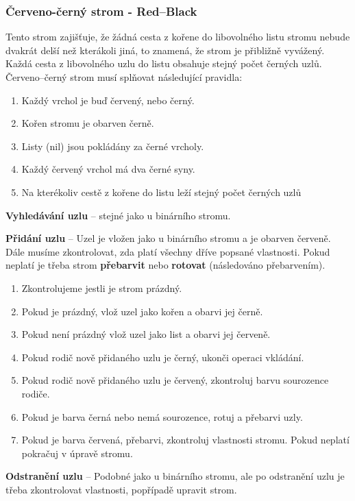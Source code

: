 \subsubsection{Červeno-černý strom - Red–Black}
Tento strom zajišťuje, že žádná cesta z kořene do libovolného listu stromu nebude dvakrát delší než kterákoli jiná, to znamená, že strom je přibližně vyvážený. Každá cesta z libovolného uzlu do listu obsahuje stejný počet černých uzlů. Červeno--černý strom musí splňovat následující pravidla:
\begin{enumerate}
\item Každý vrchol je buď červený, nebo černý.
\item Kořen stromu je obarven černě.
\item Listy (nil) jsou pokládány za černé vrcholy.
\item Každý červený vrchol má dva černé syny.
\item Na kterékoliv cestě z kořene do listu leží stejný počet černých uzlů
\end{enumerate}

\textbf{Vyhledávání uzlu} -- stejné jako u binárního stromu.


\textbf{Přidání uzlu} -- Uzel je vložen jako u binárního stromu a je obarven červeně. Dále musíme zkontrolovat, zda platí všechny dříve popsané vlastnosti. Pokud neplatí je třeba strom \textbf{přebarvit} nebo \textbf{rotovat} (následováno přebarvením).
\begin{enumerate}
\item Zkontrolujeme jestli je strom prázdný.
\item Pokud je prázdný, vlož uzel jako kořen a obarvi jej černě.
\item Pokud není prázdný vlož uzel jako list a obarvi jej červeně.
\item Pokud rodič nově přidaného uzlu je černý, ukonči operaci vkládání.
\item Pokud rodič nově přidaného uzlu je červený, zkontroluj barvu sourozence rodiče.
\item Pokud je barva černá nebo nemá sourozence, rotuj a přebarvi uzly.
\item Pokud je barva červená, přebarvi, zkontroluj vlastnosti stromu. Pokud neplatí pokračuj v úpravě stromu.
\end{enumerate}


\textbf{Odstranění uzlu} -- Podobné jako u binárního stromu, ale po odstranění uzlu je třeba zkontrolovat vlastnosti, popřípadě upravit strom.

